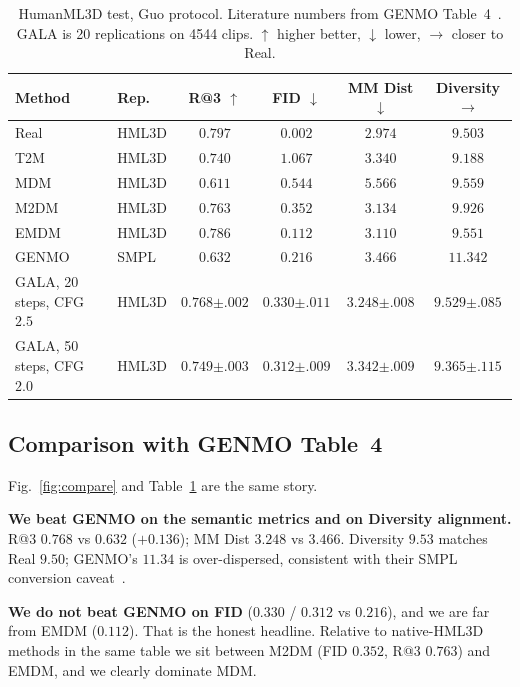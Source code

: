 \documentclass[10pt,twocolumn]{article}
\begin{document}
\begin{table}[t]
\centering
\caption{HumanML3D test, Guo protocol. Literature numbers from GENMO Table~4~\cite{li2025genmo}. GALA is 20 replications on 4544 clips. $\uparrow$ higher better, $\downarrow$ lower, $\rightarrow$ closer to Real.}
\label{tab:main}
\small
\setlength{\tabcolsep}{4.2pt}
\begin{tabular}{@{}llcccc@{}}
\toprule
Method & Rep. & R@3 $\uparrow$ & FID $\downarrow$ & MM Dist $\downarrow$ & Diversity $\rightarrow$ \\
\midrule
Real~\cite{guo2022humanml3d} & HML3D & $0.797$ & $0.002$ & $2.974$ & $9.503$ \\
T2M~\cite{guo2022humanml3d} & HML3D & $0.740$ & $1.067$ & $3.340$ & $9.188$ \\
MDM~\cite{tevet2023mdm} & HML3D & $0.611$ & $0.544$ & $5.566$ & $9.559$ \\
M2DM~\cite{kong2023m2dm} & HML3D & $0.763$ & $0.352$ & $3.134$ & $9.926$ \\
EMDM~\cite{zhou2024emdm} & HML3D & $0.786$ & $0.112$ & $3.110$ & $9.551$ \\
GENMO~\cite{li2025genmo} & SMPL & $0.632$ & $0.216$ & $3.466$ & $11.342$ \\
\midrule
GALA, 20 steps, CFG $2.5$ & HML3D & $\mathbf{0.768}{\pm.002}$ & $0.330{\pm.011}$ & $\mathbf{3.248}{\pm.008}$ & $\mathbf{9.529}{\pm.085}$ \\
GALA, 50 steps, CFG $2.0$ & HML3D & $0.749{\pm.003}$ & $\mathbf{0.312}{\pm.009}$ & $3.342{\pm.009}$ & $9.365{\pm.115}$ \\
\bottomrule
\end{tabular}
\end{table}

\subsection{Comparison with GENMO Table~4}

Fig.~\ref{fig:compare} and Table~\ref{tab:main} are the same story.

\textbf{We beat GENMO on the semantic metrics and on Diversity alignment.}
R@3 $0.768$ vs $0.632$ ($+0.136$); MM Dist $3.248$ vs $3.466$.
Diversity $9.53$ matches Real $9.50$; GENMO's $11.34$ is over-dispersed, consistent with their SMPL conversion caveat~\cite{li2025genmo}.

\textbf{We do not beat GENMO on FID} ($0.330$ / $0.312$ vs $0.216$), and we are far from EMDM ($0.112$).
That is the honest headline.
Relative to native-HML3D methods in the same table we sit between M2DM (FID $0.352$, R@3 $0.763$) and EMDM, and we clearly dominate MDM.
\end{document}
